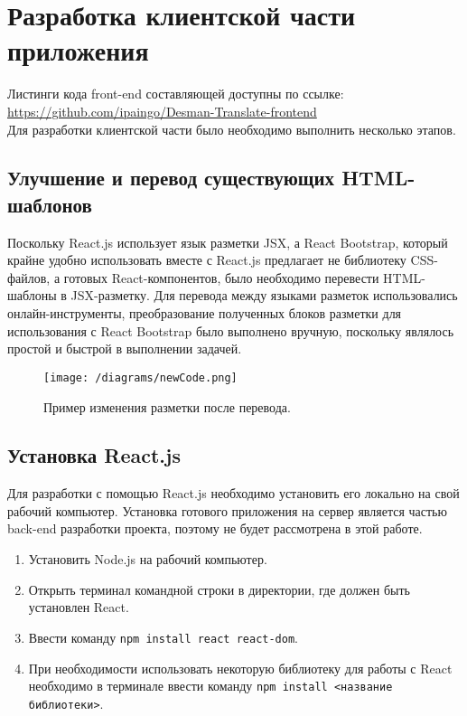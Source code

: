 \documentclass[a4paper,12pt]{article}
\begin{document}




\newpage
\section{Разработка клиентской части приложения}

Листинги кода front-end составляющей доступны по ссылке:\\
\href{https://github.com/ipaingo/Desman-Translate-frontend}{https://github.com/ipaingo/Desman-Translate-frontend}\\

Для разработки клиентской части было необходимо выполнить несколько этапов.

\subsection{Улучшение и перевод существующих HTML-шаблонов}
Поскольку React.js использует язык разметки JSX, а React Bootstrap, который крайне удобно использовать вместе с React.js предлагает не библиотеку CSS-файлов, а готовых React-компонентов, было необходимо перевести HTML-шаблоны в JSX-разметку. Для перевода между языками разметок использовались онлайн-инструменты, преобразование полученных блоков разметки для использования с React Bootstrap было выполнено вручную, поскольку являлось простой и быстрой в выполнении задачей.

\begin{figure}[H]
\centering
\texttt{[image: /diagrams/newCode.png]}
\caption{Пример изменения разметки после перевода.}
\label{fig:diagramnewcode}
\end{figure}

\subsection{Установка React.js}
Для разработки с помощью React.js необходимо установить его локально на свой рабочий компьютер. Установка готового приложения на сервер является частью back-end разработки проекта, поэтому не будет рассмотрена в этой работе.

\begin{enumerate}
\item Установить Node.js на рабочий компьютер.
\item Открыть терминал командной строки в директории, где должен быть установлен React.
\item Ввести команду \texttt{npm install react react-dom}.
\item При необходимости использовать некоторую библиотеку для работы с React необходимо в терминале ввести команду \texttt{npm install <название библиотеки>}.
\end{enumerate}
\end{document}
